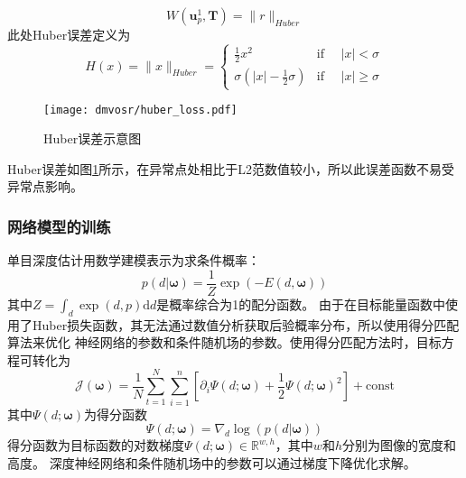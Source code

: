 \begin{equation}
    W(\mathbf{u}_p^1,\mathbf{T}) = \|r \|_{Huber}
\end{equation}
此处Huber误差定义为
\begin{equation}
    H(x) = \|x\|_{Huber} =    
    \begin{cases}
        \frac{1}{2} x^2 & \text{if }\quad |x| < \sigma \\
        \sigma(|x|-\frac{1}{2}\sigma)              & \text{if }\quad |x| \geq \sigma
    \end{cases}
\end{equation}
\begin{figure}[h]
    \centering
    \texttt{[image: dmvosr/huber\_loss.pdf]}
    \caption{Huber误差示意图}
    \label{fig:deepsr_huber}
\end{figure}
Huber误差如图\ref{fig:deepsr_huber}所示，在异常点处相比于L2范数值较小，所以此误差函数不易受异常点影响。



\subsubsection{网络模型的训练}
单目深度估计用数学建模表示为求条件概率：
\begin{equation}
    p(d|\mathbf{\omega}) = \frac{1}{Z}\exp(-E(d,\mathbf{\omega}))
\end{equation}
其中$Z=\int_d \exp(d,p)\text{d}d $是概率综合为1的配分函数。
由于在目标能量函数中使用了Huber损失函数，其无法通过数值分析获取后验概率分布，所以使用得分匹配算法\cite{hyvarinen2005estimation}来优化
神经网络的参数和条件随机场的参数。使用得分匹配方法时，目标方程可转化为
\begin{equation}
    \mathcal{J(\mathbf{\omega})} = \frac{1}{N}\sum_{t=1}^{N}\sum_{i=1}^{n}\left[\partial_i \Psi(d;\mathbf{\omega}) + \frac{1}{2} \Psi(d;\mathbf{\omega})^2\right] + \text{const}
\end{equation}
其中$\Psi(d;\mathbf{\omega})$为得分函数
\begin{equation}
    \Psi(d;\mathbf{\omega}) = \nabla_d \log(p(d|\mathbf{\omega}))
\end{equation}
得分函数为目标函数的对数梯度$\Psi(d;\mathbf{\omega}) \in \mathbb{R}^{w,h}$，其中$w$和$h$分别为图像的宽度和高度。
深度神经网络和条件随机场中的参数可以通过梯度下降优化求解。

